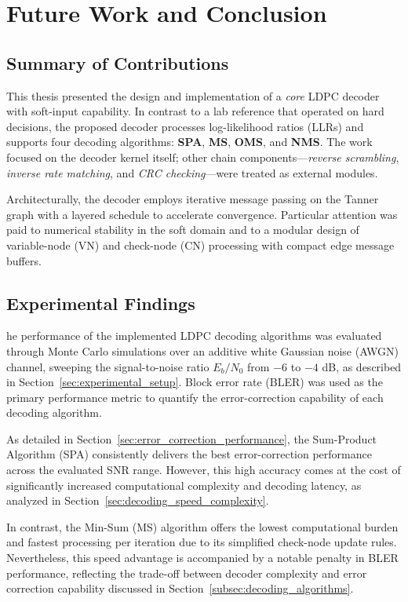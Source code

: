 \documentclass[../main.tex]{subfiles}
\begin{document}
\chapter{Future Work and Conclusion}
\label{chap:conclusion}

\section*{Summary of Contributions}
This thesis presented the design and implementation of a \emph{core} LDPC decoder with soft-input capability. In contrast to a lab reference that operated on hard decisions, the proposed decoder processes log-likelihood ratios (LLRs) and supports four decoding algorithms: \textbf{SPA}, \textbf{MS}, \textbf{OMS}, and \textbf{NMS}. The work focused on the decoder kernel itself; other chain components---\emph{reverse scrambling}, \emph{inverse rate matching}, and \emph{CRC checking}---were treated as external modules.

Architecturally, the decoder employs iterative message passing on the Tanner graph with a layered schedule to accelerate convergence. Particular attention was paid to numerical stability in the soft domain and to a modular design of variable-node (VN) and check-node (CN) processing with compact edge message buffers.

\section*{Experimental Findings}
he performance of the implemented LDPC decoding algorithms was evaluated through Monte Carlo simulations over an additive white Gaussian noise (AWGN) channel, sweeping the signal-to-noise ratio \(E_b/N_0\) from \(-6\) to \(-4\) dB, as described in Section~\ref{sec:experimental_setup}. Block error rate (BLER) was used as the primary performance metric to quantify the error-correction capability of each decoding algorithm.

As detailed in Section~\ref{sec:error_correction_performance}, the Sum-Product Algorithm (SPA) consistently delivers the best error-correction performance across the evaluated SNR range. However, this high accuracy comes at the cost of significantly increased computational complexity and decoding latency, as analyzed in Section~\ref{sec:decoding_speed_complexity}.

In contrast, the Min-Sum (MS) algorithm offers the lowest computational burden and fastest processing per iteration due to its simplified check-node update rules. Nevertheless, this speed advantage is accompanied by a notable penalty in BLER performance, reflecting the trade-off between decoder complexity and error correction capability discussed in Section~\ref{subsec:decoding_algorithms}.
\end{document}
